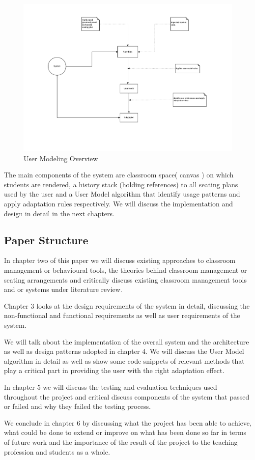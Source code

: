 \begin{figure}[!ht]
\caption{User Modeling Overview}
    \label{fig:User-Model}
    \centering
    \includegraphics[scale=0.5]{figures/UM_Overview}
\end{figure}

The main components of the system are classroom space( canvas ) on which students are rendered, a history stack (holding references) to all seating plans used by the user and a User Model algorithm that identify usage patterns and apply adaptation rules respectively. We will discuss the implementation and design in detail in the next chapters.

\subsection{Paper Structure}
In chapter two of this paper we will discuss existing approaches to classroom management or behavioural tools, the theories behind classroom management or seating arrangements and  critically discuss existing classroom management tools and or systems under literature review.

Chapter 3 looks at the design requirements of the system in detail, discussing the non-functional and functional requirements as well as user requirements of the system.

We will talk about the implementation of the overall system and the architecture as well as design patterns adopted in chapter 4. We will discuss the User Model algorithm in detail as well as show some code snippets of relevant methods that play a critical part in providing the user with the right adaptation effect.

In chapter 5 we will discuss the testing and evaluation techniques used throughout the project and critical discuss components of the system that passed or failed and why they failed the testing process.

We conclude in chapter 6 by discussing what the project has been able to achieve, what could be done to extend or improve on what has been done so far in terms of future work and the importance of the result of the project to the teaching profession and students as a whole.

